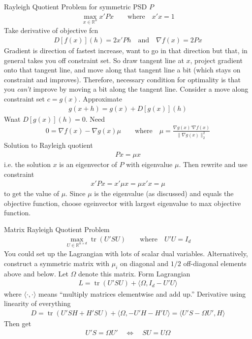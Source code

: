 \documentclass[12pt]{book}
\numberwithin{equation}{section} %
\theoremstyle{plain}
\theoremstyle{definition}
\theoremstyle{remark}
\newcommand{\trace}{\operatorname{tr}}
\newcommand{\R}{\mathbb{R}}
\newcommand{\Rn}{\mathbb{R}^n}
\begin{document}
Rayleigh Quotient Problem
for symmetric PSD $P$
\begin{align*}
  \max_{x\in\Rn} x'Px
  \qquad\text{where}\quad
  x'x=1
\end{align*}
Take derivative of objective fcn
\begin{align*}
  D[f(x)](h) = 2x'Ph
  \quad\text{and}\quad
  \nabla f(x) = 2Px
\end{align*}
Gradient is direction of fastest increase, want to go in that direction
but that, in general takes you off constraint set. So draw tangent line
at $x$, project gradient onto that tangent line, and move along that
tangent line a bit (which stays on constraint and improves).
Therefore, necessary condition for optimality is that you \emph{can't}
improve by moving a bit along the tangent line.
Consider a move along constraint set $c=g(x)$.
Approximate
\begin{align*}
  g(x+h)=g(x)+D[g(x)](h)
\end{align*}
Wnat $D[g(x)](h)=0$.
Need
\begin{align*}
  0 = \nabla f(x)-\nabla g(x)\mu
  \qquad\text{where}\quad
  \mu=
  \frac{\nabla g(x)'\nabla f(x)}{\lVert\nabla g(x)\rVert^2_2}
\end{align*}
Solution to Rayleigh quotient
\begin{align*}
  Px=\mu x
\end{align*}
i.e. the solution $x$ is an eigenvector of $P$ with eigenvalue $\mu$.
Then rewrite and use constraint
\begin{align*}
  x'Px=x'\mu x=\mu x'x = \mu
\end{align*}
to get the value of $\mu$.
Since $\mu$ is the eigenvalue (as discussed) and equals the objective
function, choose egeinvector with largest eigenvalue to max objective
function.

Matrix Rayleigh Quotient Problem
\begin{align*}
  \max_{U\in\R^{n\times d}} \trace(U'SU)
  \qquad\text{where}\quad
  U'U=I_d
\end{align*}
You could set up the Lagrangian with lots of scalar dual variables.
Alternatively, construct a symmetric matrix with $\mu_i$ on diagonal and
$1/2$ off-diagonal elements above and below.
Let $\Omega$ denote this matrix.
Form Lagrangian
\begin{align*}
  L=\trace(U'SU) + \langle \Omega,I_d-U'U\rangle
\end{align*}
where $\langle\cdot,\cdot\rangle$ means ``multiply matrices elementwise
and add up.''
Derivative using linearity of everything
\begin{align*}
  D = \trace(U'SH+H'SU)+\langle \Omega,-U'H-H'U\rangle
  = \langle U'S-\Omega U',H\rangle
\end{align*}
Then get
\begin{align*}
  U'S=\Omega U'
  \quad\iff\quad
  SU=U\Omega
\end{align*}
\end{document}
